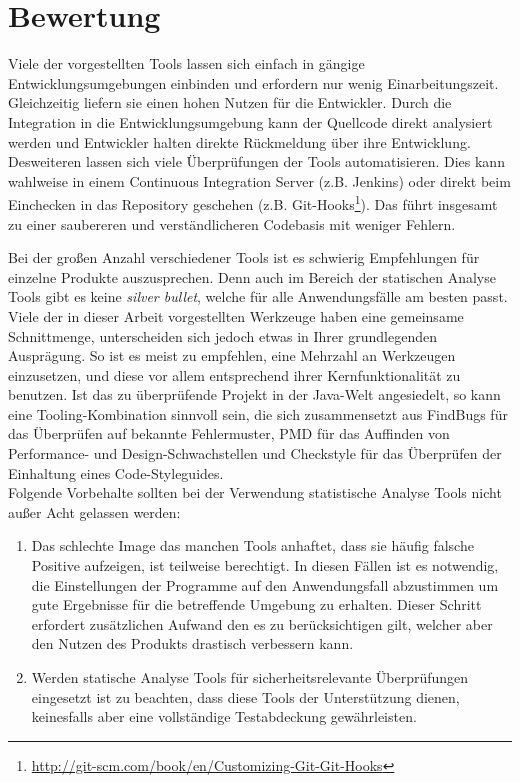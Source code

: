 \section{Bewertung}
Viele der vorgestellten Tools lassen sich einfach in gängige Entwicklungsumgebungen einbinden und erfordern nur wenig Einarbeitungszeit. Gleichzeitig liefern sie einen hohen Nutzen für die Entwickler. 
Durch die Integration in die Entwicklungsumgebung kann der Quellcode direkt analysiert werden und Entwickler halten direkte Rückmeldung über ihre Entwicklung. Desweiteren lassen sich viele Überprüfungen der Tools automatisieren. Dies kann wahlweise in einem Continuous Integration Server (z.B. Jenkins) oder direkt beim Einchecken in das Repository geschehen (z.B. Git-Hooks\footnote{\url{http://git-scm.com/book/en/Customizing-Git-Git-Hooks}}). Das führt insgesamt zu einer saubereren und verständlicheren Codebasis mit weniger Fehlern.

Bei der großen Anzahl verschiedener Tools ist es schwierig Empfehlungen für einzelne Produkte auszusprechen. Denn auch im Bereich der statischen Analyse Tools gibt es keine \emph{silver bullet}, welche für alle Anwendungsfälle am besten passt. Viele der in dieser Arbeit vorgestellten Werkzeuge haben eine gemeinsame Schnittmenge, unterscheiden sich jedoch etwas in Ihrer grundlegenden Ausprägung. So ist es meist zu empfehlen, eine Mehrzahl an Werkzeugen einzusetzen, und diese vor allem entsprechend ihrer Kernfunktionalität zu benutzen.
Ist das zu überprüfende Projekt in der Java-Welt angesiedelt, so kann eine Tooling-Kombination sinnvoll sein, die sich zusammensetzt aus FindBugs für das Überprüfen auf bekannte Fehlermuster, PMD für das Auffinden von Performance- und Design-Schwachstellen und Checkstyle für das Überprüfen der Einhaltung eines Code-Styleguides.\\

Folgende Vorbehalte sollten bei der Verwendung statistische Analyse Tools nicht außer Acht gelassen werden:
\begin{enumerate}
  \item Das schlechte Image das manchen Tools anhaftet, dass sie häufig falsche Positive aufzeigen, ist teilweise berechtigt. In diesen Fällen ist es notwendig, die Einstellungen der Programme auf den Anwendungsfall abzustimmen um gute Ergebnisse für die betreffende Umgebung zu erhalten. Dieser Schritt erfordert zusätzlichen Aufwand den es zu berücksichtigen gilt, welcher aber den Nutzen des Produkts drastisch verbessern kann.
  \item Werden statische Analyse Tools für sicherheitsrelevante Überprüfungen eingesetzt ist zu beachten, dass diese Tools der Unterstützung dienen, keinesfalls aber eine vollständige Testabdeckung gewährleisten.
\end{enumerate}


